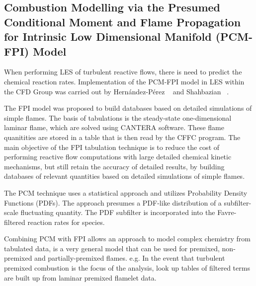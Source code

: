 \subsection{Combustion Modelling via the Presumed Conditional Moment and Flame Propagation for Intrinsic Low Dimensional Manifold (PCM-FPI) Model}

When performing LES of turbulent reactive flows, there is need to predict the chemical reaction rates. Implementation of the PCM-FPI model in LES within the CFD Group was carried out by Hern{\'a}ndez-P{\'e}rez ~\cite{HPerez:2011} and Shahbazian \etal ~\cite{Shahbazian:2011}.\par

The FPI model was proposed to build databases based on detailed simulations of simple flames. The basis of tabulations is the steady-state one-dimensional laminar flame, which are solved using CANTERA software. These flame quanitities are stored in a table that is then read by the CFFC program. The main objective of the FPI tabulation technique is to reduce the cost of performing reactive
flow computations with large detailed chemical kinetic mechanisms, but still retain the accuracy of detailed results, by building databases of relevant quantities based on detailed simulations of simple flames. ~\cite{HPerez:2011} \par

The PCM technique uses a statistical approach and utilizes Probability Density Functions (PDFs). The approach presumes a PDF-like distribution of a subfilter-scale fluctuating quantity. The PDF subfilter is incorporated into the Favre-filtered reaction rates for species.\par

Combining PCM with FPI allows an approach to model complex chemistry from tabulated data, is a very general model that can be used for premixed, non-premixed and partially-premixed flames. e.g. In the event that turbulent premixed combustion is the focus of the analysis, look up tables of filtered terms are built up from laminar premixed flamelet data.\par
